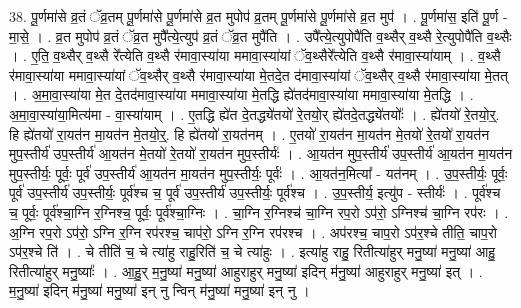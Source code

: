 \documentclass[17pt]{extarticle}
\begin{document}
38. पू॒र्णमा॑से व्र॒तं ॅव्र॒तम् पू॒र्णमा॑से पू॒र्णमा॑से व्र॒त मुपोप॑ व्र॒तम् पू॒र्णमा॑से पू॒र्णमा॑से व्र॒त मुप॑ । . पू॒र्णमा॑स॒ इति॑ पू॒र्ण - मा॒से॒ । . व्र॒त मुपोप॑ व्र॒तं ॅव्र॒त मुपै᳚त्ये॒त्युप॑ व्र॒तं ॅव्र॒त मुपै॑ति । . उपै᳚त्ये॒त्युपोपै॑ति व॒थ्सैर् व॒थ्सै रे॒त्युपोपै॑ति व॒थ्सैः । . ए॒ति॒ व॒थ्सैर् व॒थ्सै रे᳚त्येति व॒थ्सै र॑मावा॒स्या॑या ममावा॒स्या॑यां ॅव॒थ्सैरे᳚त्येति व॒थ्सै र॑मावा॒स्या॑याम् । . व॒थ्सै र॑मावा॒स्या॑या ममावा॒स्या॑यां ॅव॒थ्सैर् व॒थ्सै र॑मावा॒स्या॑या मे॒तदे॒त द॑मावा॒स्या॑यां ॅव॒थ्सैर् व॒थ्सै र॑मावा॒स्या॑या मे॒तत् । . अ॒मा॒वा॒स्या॑या मे॒त दे॒तद॑मावा॒स्या॑या ममावा॒स्या॑या मे॒तद्धि ह्ये॑तद॑मावा॒स्या॑या ममावा॒स्या॑या मे॒तद्धि । . अ॒मा॒वा॒स्या॑या॒मित्य॑मा - वा॒स्या॑याम् । . ए॒तद्धि ह्ये॑त दे॒तद्ध्ये॑तयो॑ रे॒तयो॒र् ह्ये॑तदे॒तद्ध्ये॑तयोः᳚ । . ह्ये॑तयो॑ रे॒तयो॒र्॒. हि ह्ये॑तयो॑ रा॒यत॑न मा॒यत॑न मे॒तयो॒र्॒. हि ह्ये॑तयो॑ रा॒यत॑नम् । . ए॒तयो॑ रा॒यत॑न मा॒यत॑न मे॒तयो॑ रे॒तयो॑ रा॒यत॑न मुप॒स्तीर्य॑ उप॒स्तीर्य॑ आ॒यत॑न मे॒तयो॑ रे॒तयो॑ रा॒यत॑न मुप॒स्तीर्यः॑ । . आ॒यत॑न मुप॒स्तीर्य॑ उप॒स्तीर्य॑ आ॒यत॑न मा॒यत॑न मुप॒स्तीर्यः॒ पूर्वः॒ पूर्व॑ उप॒स्तीर्य॑ आ॒यत॑न मा॒यत॑न मुप॒स्तीर्यः॒ पूर्वः॑ । . आ॒यत॑न॒मित्या᳚ - यत॑नम् । . उ॒प॒स्तीर्यः॒ पूर्वः॒ पूर्व॑ उप॒स्तीर्य॑ उप॒स्तीर्यः॒ पूर्व॑श्च च॒ पूर्व॑ उप॒स्तीर्य॑ उप॒स्तीर्यः॒ पूर्व॑श्च । . उ॒प॒स्तीर्य॒ इत्यु॑प - स्तीर्यः॑ । . पूर्व॑श्च च॒ पूर्वः॒ पूर्व॑श्चा॒ग्नि र॒ग्निश्च॒ पूर्वः॒ पूर्व॑श्चा॒ग्निः । . चा॒ग्नि र॒ग्निश्च॑ चा॒ग्नि रप॒रो ऽप॑रो॒ ऽग्निश्च॑ चा॒ग्नि रप॑रः । . अ॒ग्नि रप॒रो ऽप॑रो॒ ऽग्नि र॒ग्नि रप॑रश्च॒ चाप॑रो॒ ऽग्नि र॒ग्नि रप॑रश्च । . अप॑रश्च॒ चाप॒रो ऽप॑र॒श्चे तीति॒ चाप॒रो ऽप॑र॒श्चे ति॑ । . चे तीति॑ च॒ चे त्या॑हु राहु॒रिति॑ च॒ चे त्या॑हुः । . इत्या॑हु राहु॒ रितीत्या॑हुर् मनु॒ष्या॑ मनु॒ष्या॑ आहु॒ रितीत्या॑हुर् मनु॒ष्याः᳚ । . आ॒हु॒र् म॒नु॒ष्या॑ मनु॒ष्या॑ आहुराहुर् मनु॒ष्या॑ इदिन् म॑नु॒ष्या॑ आहुराहुर् मनु॒ष्या॑ इत् । . म॒नु॒ष्या॑ इदिन् म॑नु॒ष्या॑ मनु॒ष्या॑ इन् नु न्विन् म॑नु॒ष्या॑ मनु॒ष्या॑ इन् नु । \newline
\pagebreak
{}
\end{document}
